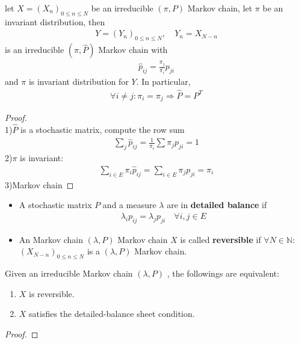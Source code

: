 \begin{theorem}
	let $X = (X_n)_{0 \le n \le N}$ be an irreducible $(\pi,P)$ Markov chain, let $\pi$ be an invariant distribution, then
	\begin{align*}
		Y = (Y_n)_{0 \le n \le N},\quad Y_n = X_{N - n}
	\end{align*}
	is an irreducible $(\pi, \hat{P})$ Markov chain with
	\begin{align*}
		\hat{p}_{ij} = \frac{\pi_j}{\pi_i} p_{ji}
	\end{align*}
	and $\pi$ is invariant distribution for $Y$. In particular, 
	\begin{align*}
		\forall i \neq j : \pi_i = \pi_j \Rightarrow \hat{P} = P^T
	\end{align*}
\end{theorem}
\begin{proof}\quad\\
	1)$\hat{P}$ is a stochastic matrix, compute the row sum
	\begin{align*}
		\sum_j \hat{p}_{ij} = \frac{1}{\pi_i} \sum \pi_j p_{ji} = 1
	\end{align*}
	2)$\pi$ is invariant:
	\begin{align*}
		\sum_{i \in E} \pi_i \hat{p}_{ij} = \sum_{i \in E}\pi_jp_{ji} = \pi_i
	\end{align*}
	3)Markov chain
\end{proof}

\begin{definition}\quad
	\begin{itemize}
		\item A stochastic matrix $P$ and a measure $\lambda$ are in \textbf{detailed balance} if
		\begin{align*}
			\lambda_i p_{ij} = \lambda_j p_{ji} \quad \forall i, j \in E
		\end{align*}
		\item An Markov chain $(\lambda, P)$ Markov chain $X$ is called \textbf{reversible }if $\forall N \in \mathbb{N}:$ $(X_{N-n})_{0 \le n \le N}$ is a $(\lambda, P)$ Markov chain.
	\end{itemize}
\end{definition}


\begin{theorem}
	Given an irreducible Markov chain $(\lambda, P)$ , the followings are equivalent:
	\begin{enumerate}
		\item $X$ is reversible.
		\item $X$ satisfies the detailed-balance sheet condition.
	\end{enumerate}
\end{theorem}
\begin{proof}
	
\end{proof}

